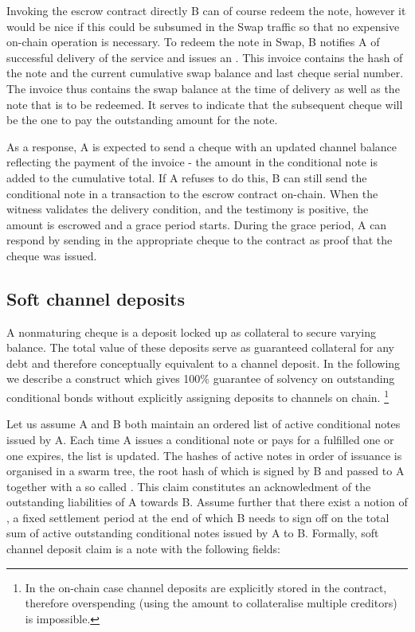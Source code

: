 Invoking the escrow contract directly B can of course redeem the note, however it would be nice if this could be subsumed in the Swap traffic so that no expensive on-chain operation is necessary. 
To redeem the note in Swap, B notifies A of successful delivery of the service and issues  an . This invoice contains the hash of the note and the current cumulative swap balance and last cheque serial number. The invoice thus contains the swap balance at the time of delivery as well as the note that is to be redeemed. It serves to indicate that the subsequent cheque will be the one to pay the outstanding amount for the note.

As a response, A is expected to send a cheque with an updated channel balance reflecting the payment of the invoice - the amount in the conditional note is added to the cumulative total. If A refuses to do this, B can still send the conditional note in a transaction to the escrow contract on-chain. When the witness validates the delivery condition, and the testimony is positive, the amount is escrowed and a grace period starts. During the grace period, A can respond by sending in the appropriate cheque to the contract as proof that the cheque was issued.

\subsection{Soft channel deposits}
A nonmaturing cheque is a deposit locked up as collateral to secure varying balance.
The total value of these deposits serve as guaranteed collateral for any debt and
therefore conceptually equivalent to a channel deposit.
In the following we describe a construct which gives 100$\%$ guarantee of solvency
on outstanding conditional bonds without explicitly assigning deposits to channels on chain.%
%
\footnote{In the on-chain case channel deposits are explicitly stored in the contract, therefore overspending
(using the amount to collateralise multiple creditors) is impossible.}

Let us assume A and B both maintain an ordered list of active conditional notes issued by A.
Each time A issues a conditional note or pays for a fulfilled one or one expires, the list is updated.
The hashes of active notes in order of issuance is organised in a swarm tree, the
root hash of which is signed by B and passed to A together with a so called
. This claim constitutes an acknowledment of
the outstanding liabilities of A towards B. Assume further that there exist a notion of ,
a fixed settlement period at the end of which B needs to sign off on the total sum of active
outstanding conditional notes issued by A to B.
Formally, soft channel deposit claim is a note with the following fields:

